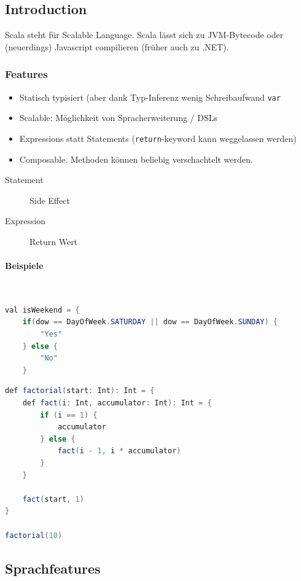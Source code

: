 \subsection{Introduction}

Scala steht für Scalable Language. Scala lässt sich zu JVM-Bytecode oder (neuerdings) Javascript compilieren (früher auch zu .NET).

\subsubsection{Features}

\begin{itemize}
	\item Statisch typisiert (aber dank Typ-Inferenz wenig Schreibaufwand \lstinline|var|
	\item Scalable: Möglichkeit von Spracherweiterung / DSLs
	\item Expressions statt Statements (\lstinline|return|-keyword kann weggelassen werden)
	\item Composable. Methoden können beliebig verschachtelt werden.
	
\end{itemize}

\begin{description}
	\item[Statement] Side Effect
	\item[Expression] Return Wert
\end{description}

\paragraph{Beispiele} \hfill \\

\begin{lstlisting}[language=java]
val isWeekend = {
	if(dow == DayOfWeek.SATURDAY || dow == DayOfWeek.SUNDAY) {
		"Yes"
	} else {
		"No"
	}
\end{lstlisting}

\begin{lstlisting}[language=java]
def factorial(start: Int): Int = {
	def fact(i: Int, accumulator: Int): Int = {
		if (i == 1) {
			accumulator
		} else {
			fact(i - 1, i * accumulator)
		}
	}
	
	fact(start, 1) 
}

factorial(10)
\end{lstlisting}

\subsection{Sprachfeatures}

